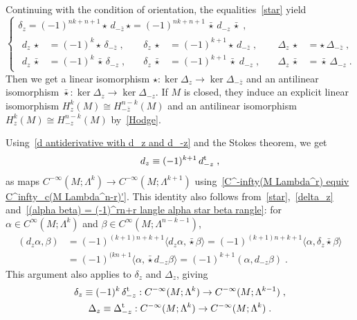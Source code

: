 \documentclass{memo-l}
\theoremstyle{plain}
\theoremstyle{definition}
\theoremstyle{remark}
\newcommand{\trans}{{\text{\rm t}}}
\numberwithin{section}{chapter}
\numberwithin{equation}{section}%
\begin{document}
Continuing with the condition of orientation, the equalities~\eqref{star} yield
\begin{equation}\label{delta_z}
\left\{
\begin{gathered}
\delta_z=(-1)^{nk+n+1}\star\,d_{-\bar z}\,\star=(-1)^{nk+n+1}\,\bar\star\,d_{-z}\,\bar\star\;,\\
\begin{alignedat}{3}
d_z\,\star&=(-1)^k\star\,\delta_{-\bar z}\;,&\quad
\delta_z\,\star&=(-1)^{k+1}\star\,d_{-\bar z}\;,&\quad
\Delta_z\,\star&=\star\,\Delta_{-\bar z}\;,\\
d_z\,\bar\star&=(-1)^k\,\bar\star\,\delta_{-z}\;,&\quad\delta_z\,\bar\star&=(-1)^{k+1}\,\bar\star\;d_{-z}\;,&\quad
\Delta_z\,\bar\star&=\bar\star\,\Delta_{-z}\;.
\end{alignedat}
\end{gathered}
\right.
\end{equation}
Then we get a linear isomorphism $\star:\ker\Delta_z\to\ker\Delta_{-\bar z}$ and an antilinear isomorphism $\bar\star:\ker\Delta_z\to\ker\Delta_{-z}$. If $M$ is closed, they induce an explicit linear isomorphism $H_z^k(M)\cong H_{-\bar z}^{n-k}(M)$ and an antilinear isomorphism $H_z^k(M)\cong H_{-z}^{n-k}(M)$ by~\eqref{Hodge}.

Using~\eqref{d antiderivative with d_z and d_-z} and the Stokes theorem, we get
\begin{equation}\label{d_z equiv (-1)^k+1 d_-z^t}
d_z\equiv(-1)^{k+1}\,d_{-z}^\trans\;,
\end{equation}
as maps $C^{-\infty}(M;\Lambda^k)\to C^{-\infty}(M;\Lambda^{k+1})$ using~\eqref{C^-infty(M Lambda^r) equiv C^infty_c(M Lambda^n-r)'}. This identity also follows from~\eqref{star},~\eqref{delta_z} and~\eqref{(alpha beta) = (-1)^rn+r langle alpha star beta rangle}: for $\alpha\in C^\infty(M;\Lambda^k)$ and $\beta\in C^\infty(M;\Lambda^{n-k-1})$,
\begin{align*}
(d_z\alpha,\beta)&=(-1)^{(k+1)n+k+1}\langle d_z\alpha,\bar\star\beta\rangle
=(-1)^{(k+1)n+k+1}\langle\alpha,\delta_z{\bar\star\beta}\rangle\\
&=(-1)^{(kn+1}\langle\alpha,\bar\star d_{-z}\beta\rangle=(-1)^{k+1}(\alpha,d_{-z}\beta)\;.
\end{align*}
This argument also applies to $\delta_z$ and $\Delta_z$, giving
\begin{gather}
\delta_z\equiv(-1)^k\,\delta_{-z}^\trans:C^{-\infty}(M;\Lambda^k)\to C^{-\infty}(M;\Lambda^{k-1})\;,\notag\\
\Delta_z\equiv\Delta_{-z}^\trans:C^{-\infty}(M;\Lambda^k)\to C^{-\infty}(M;\Lambda^k)\;.
\label{Delta_z equiv Delta_-bar z^t}
\end{gather}
\end{document}
